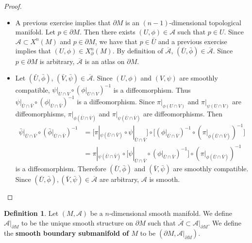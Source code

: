 \documentclass{book}
\theoremstyle{definition}
\newtheorem{defn}[definition]{Definition}
\newcommand{\MA}{\mathcal{A}}
\DeclareMathOperator*{\0}{\mbf{0}}
\DeclareMathOperator*{\1}{\mbf{1}}
\newcommand{\tbf}[1]{\textbf{#1}}
\newcommand{\ol}[1]{\overline{#1}}
\newcommand{\p}{\partial}
\begin{document}
	\begin{proof}\
		\begin{itemize}
			\item A previous exercise implies that $\p M$ is an $(n-1)$-dimensional topological manifold. Let $p \in \partial M$. Then there exists $(U, \phi) \in \MA$ such that $p \in U$. Since $\MA \subset X^n(M)$ and $p \in \p M$, we have that $p \in \bar{U}$ and a previous exercise implies that $(U, \phi) \in X^n_{\p}(M)$. By definition of $\ol{\MA}$, $(\bar{U}, \bar{\phi}) \in \ol{\MA}$. Since $p \in \p M$ is arbitrary, $\ol{\MA}$ is an atlas on $\p M$. 
			
			
			\item Let $(\bar{U}, \bar{\phi})$, $(\bar{V}, \bar{\psi}) \in \ol{\MA}$. Since $(U, \phi)$ and $(V, \psi)$ are smoothly compatible, $\psi|_{U \cap V} \circ (\phi|_{U \cap V})^{-1}$ is a diffeomorphism. Thus $\psi|_{\bar{U} \cap \bar{V}} \circ (\phi|_{\bar{U} \cap \bar{V}})^{-1}$ is a diffeomorphism. Since $\pi|_{\phi(U \cap V)}$ and $\pi|_{\psi(U \cap V)}$ are diffeomorphisms, $\pi|_{\phi(\bar{U} \cap \bar{V})}$ and $\pi|_{\psi(\bar{U} \cap \bar{V})}$ are diffeomorphisms. Then 
			\begin{align*}
				\bar{\psi}|_{\bar{U} \cap \bar{V}} \circ (\bar{\phi}|_{\bar{U} \cap \bar{V}})^{-1}
				& = \bigg[ \pi|_{\psi(\bar{U} \cap \bar{V})} \circ \psi|_{\bar{U} \cap \bar{V}} \bigg] \circ \bigg[ (\phi|_{\bar{U} \cap \bar{V}})^{-1} \circ( \pi|_{\phi(\bar{U} \cap \bar{V})})^{-1} \bigg] \\
				& =\pi|_{\psi(\bar{U} \cap \bar{V})} \circ \bigg[ \psi|_{\bar{U} \cap \bar{V}} \circ (\phi|_{\bar{U} \cap \bar{V}})^{-1} \bigg] \circ (\pi|_{\phi(\bar{U} \cap \bar{V})})^{-1}
			\end{align*}
			is a diffeomorphism. Therefore $(\bar{U}, \bar{\phi})$ and $(\bar{V}, \bar{\psi})$ are smoothly compatible. Since $(\bar{U}, \bar{\phi}), (\bar{V}, \bar{\psi}) \in \ol{\MA}$ are arbitrary, $\MA$ is smooth.
		\end{itemize}
	\end{proof}

	\begin{defn}
		Let $(M, \MA)$ be a $n$-dimensional smooth manifold. We define $\MA|_{\p M}$ to be the unique smooth structure on $\p M$ such that $\ol{\MA} \subset \MA|_{\p M}$. We define the \tbf{smooth boundary submanifold of $M$} to be $(\p M, \MA|_{\p M})$.
	\end{defn}
\end{document}
